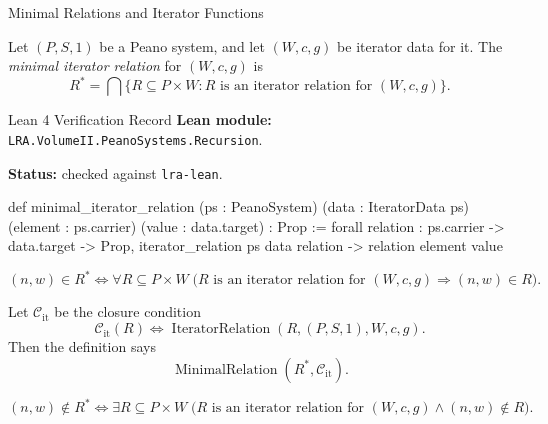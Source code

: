 \begin{topicbox}{Minimal Relations and Iterator Functions}
\begin{tcolorbox}[colback=defbox, colframe=defborder, arc=2pt,
  left=6pt, right=6pt, top=4pt, bottom=4pt,
  title={\small\textbf{Definition (Minimal Iterator Relation)}},
  fonttitle=\small\bfseries]
\begin{definition}
\label{def:minimal-iterator-relation}
Let $(P,S,1)$ be a Peano system, and let $(W,c,g)$ be iterator data for it.
The \emph{minimal iterator relation} for $(W,c,g)$ is
\[
R^*
=
\bigcap\{R\subseteq P\times W : R \text{ is an iterator relation for }
(W,c,g)\}.
\]
\end{definition}
\end{tcolorbox}

\begin{formalizationrecord}{Lean 4 Verification Record}
\textbf{Lean module:} \texttt{LRA.VolumeII.PeanoSystems.Recursion}.\par
{}
\textbf{Status:} checked against \texttt{lra-lean}.\par

\begin{leancode}
def minimal_iterator_relation
    (ps : PeanoSystem)
    (data : IteratorData ps)
    (element : ps.carrier)
    (value : data.target) : Prop :=
  forall relation : ps.carrier -> data.target -> Prop,
    iterator_relation ps data relation ->
    relation element value
\end{leancode}
\end{formalizationrecord}

\begin{remark*}
\[
(n,w)\in R^*
\Longleftrightarrow
\forall R\subseteq P\times W\;
\bigl(R \text{ is an iterator relation for } (W,c,g)
\Longrightarrow (n,w)\in R\bigr).
\]
\end{remark*}

\begin{remark*}
Let $\mathcal C_{\mathrm{it}}$ be the closure condition
\[
\mathcal C_{\mathrm{it}}(R)
\Longleftrightarrow
\operatorname{IteratorRelation}(R,(P,S,1),W,c,g).
\]
Then the definition says
\[
\operatorname{MinimalRelation}(R^*,\mathcal C_{\mathrm{it}}).
\]
\end{remark*}

\begin{remark*}
\[
(n,w)\notin R^*
\Longleftrightarrow
\exists R\subseteq P\times W\;
\bigl(R \text{ is an iterator relation for } (W,c,g)\land (n,w)\notin R\bigr).
\]
\end{remark*}


\end{topicbox}
